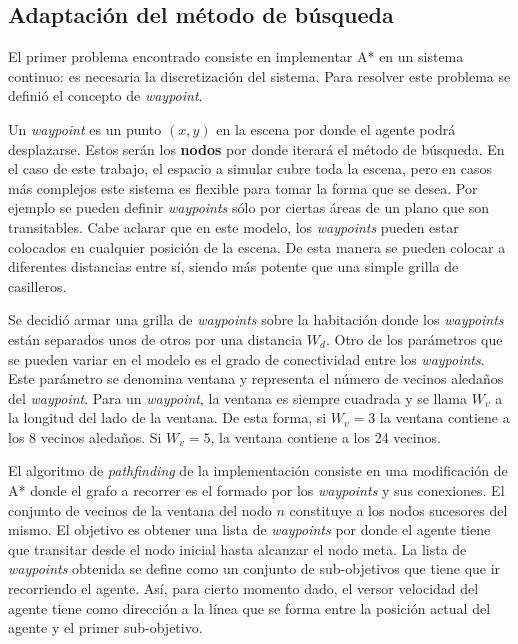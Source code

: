 \documentclass[a4paper,10pt]{article}
\begin{document}
\subsection{Adaptación del método de búsqueda}

El primer problema encontrado consiste en implementar A* en un sistema continuo: es necesaria la discretización del sistema. Para resolver este problema se definió el concepto de \textit{waypoint}.

Un \textit{waypoint} es un punto $(x,y)$ en la escena por donde el agente podrá desplazarse. Estos serán los \textbf{nodos} por donde iterará el método de búsqueda. En el caso de este trabajo, el espacio a simular cubre toda la escena, pero en casos más complejos este sistema es flexible para tomar la forma que se desea. Por ejemplo se pueden definir \textit{waypoints} sólo por ciertas áreas de un plano que son transitables. Cabe aclarar que en este modelo, los \textit{waypoints} pueden estar colocados en cualquier posición de la escena. De esta manera se pueden colocar a diferentes distancias entre sí, siendo más potente que una simple grilla de casilleros.

Se decidió armar una grilla de \textit{waypoints} sobre la habitación donde  los \textit{waypoints} están separados unos de otros por una distancia $W_{d}$. Otro de los parámetros que se pueden variar en el modelo es el grado de conectividad entre los \textit{waypoints}. Este parámetro se denomina ventana y representa el número de vecinos aledaños del \textit{waypoint}. Para un \textit{waypoint}, la ventana es siempre cuadrada y se llama $W_{v}$ a la longitud del lado de la ventana. De esta forma, si $W_{v} = 3$ la ventana contiene a los 8 vecinos aledaños. Si $W_{v} = 5$, la ventana contiene a los 24 vecinos. 

El algoritmo de \textit{pathfinding} de la implementación consiste en una modificación de A* donde el grafo a recorrer es el formado por los \textit{waypoints} y sus conexiones. El conjunto de vecinos de la ventana del nodo $n$ constituye a los nodos sucesores del mismo. El objetivo es obtener una lista de \textit{waypoints} por donde el agente tiene que transitar desde el nodo inicial hasta alcanzar el nodo meta. La lista de \textit{waypoints} obtenida se define como un conjunto de sub-objetivos que tiene que ir recorriendo el agente. Así, para cierto momento dado, el versor velocidad del agente tiene como dirección a la línea que se forma entre la posición actual del agente y el primer sub-objetivo.
\end{document}
